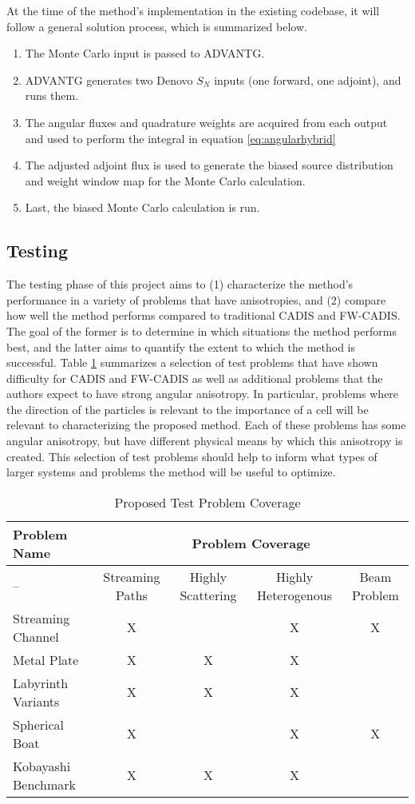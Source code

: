 \documentclass{mc2015}
\begin{document}
At the time of the method's implementation in the existing codebase, it will follow a general solution process, which is summarized below. 
\begin{enumerate}
\item The Monte Carlo input is passed to ADVANTG. 
\item ADVANTG generates two Denovo $S_N$ inputs (one forward, one adjoint), and runs them.
\item The angular fluxes and quadrature weights are acquired from each output and used to perform the integral in equation \ref{eq:angularhybrid}
\item The adjusted adjoint flux is used to generate the biased source distribution and weight window map for the Monte Carlo calculation.
\item Last, the biased Monte Carlo calculation is run. 
\end{enumerate}

\subsection{Testing}
\label{sec:Testing}

The testing phase of this project aims to (1) characterize the method's performance in a variety of problems that have anisotropies, and (2) compare how well the method performs compared to traditional CADIS and FW-CADIS.
The goal of the former is to determine in which situations the method performs best, and the latter aims to quantify the extent to which the method is successful. 
Table \ref{tab:testprobs} summarizes a selection of test problems that have shown difficulty for CADIS and FW-CADIS as well as additional problems that the authors expect to have strong angular anisotropy. 
In particular, problems where the direction of the particles is relevant to the importance of a cell will be relevant to characterizing the proposed method. Each of these problems has some angular anisotropy, but have different physical means by which this anisotropy is created. This selection of test problems should help to inform what types of larger systems and problems the method will be useful to optimize. 

 \begin{table}
  \centering
  \caption{Proposed Test Problem Coverage}
  \begin{tabular}{l|cccc}
    \toprule
    Problem Name & \multicolumn{4}{c}{Problem Coverage} \\
    \hline
    -- & Streaming Paths & Highly Scattering & Highly Heterogenous & Beam Problem \\
    \hline
    Streaming Channel   & X & & X & X \\ 
    Metal Plate         & X & X & X &  \\
    Labyrinth Variants  & X & X & X &  \\ 
    Spherical Boat      & X & & X & X \\  
    Kobayashi Benchmark & X & X & X &  \\   
	\bottomrule
  \end{tabular}
  \label{tab:testprobs}
\end{table}
\end{document}

